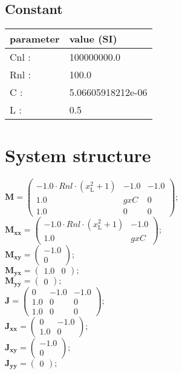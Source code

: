 \documentclass[11pt, oneside]{article}      %
\begin{document}
\subsection{Constant}
%
\begin{center}
%
\begin{tabular}{ll}
%
\hline
parameter & value (SI)
\\ \hline
Cnl :& 100000000.0
\\
Rnl :& 100.0
\\
C :& 5.06605918212e-06
\\
L :& 0.5
\\
\hline
\end{tabular}
%
\end{center}
%
\section{System structure}
%

%
$ \mathbf{M} = \left(\begin{array}{ccc}- 1.0 \cdot Rnl \cdot \left(x_{\mathrm{L}}^{2} + 1\right) & -1.0 & -1.0\\1.0 & gxC & 0\\1.0 & 0 & 0\end{array}\right) ; $ 
%
\\
%
$ \mathbf{M_{xx}} = \left(\begin{array}{cc}- 1.0 \cdot Rnl \cdot \left(x_{\mathrm{L}}^{2} + 1\right) & -1.0\\1.0 & gxC\end{array}\right) ; $ 
%
\\
%
$ \mathbf{M_{xy}} = \left(\begin{array}{c}-1.0\\0\end{array}\right) ; $ 
%
\\
%
$ \mathbf{M_{yx}} = \left(\begin{array}{cc}1.0 & 0\end{array}\right) ; $ 
%
\\
%
$ \mathbf{M_{yy}} = \left(\begin{array}{c}0\end{array}\right) ; $ 
%
\\
%

%
$ \mathbf{J} = \left(\begin{array}{ccc}0 & -1.0 & -1.0\\1.0 & 0 & 0\\1.0 & 0 & 0\end{array}\right) ; $ 
%
\\
%
$ \mathbf{J_{xx}} = \left(\begin{array}{cc}0 & -1.0\\1.0 & 0\end{array}\right) ; $ 
%
\\
%
$ \mathbf{J_{xy}} = \left(\begin{array}{c}-1.0\\0\end{array}\right) ; $ 
%
\\
%
$ \mathbf{J_{yy}} = \left(\begin{array}{c}0\end{array}\right) ; $ 
%
\\
%
\end{document}
